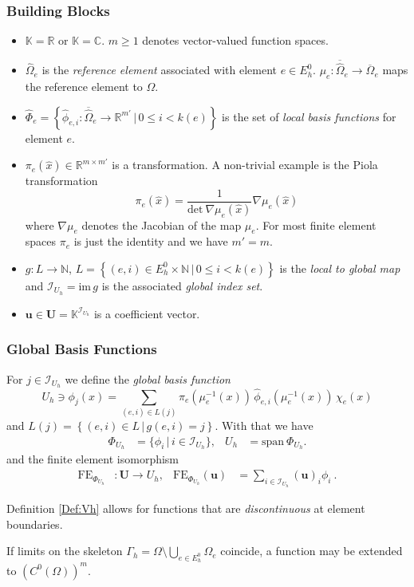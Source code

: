 \begin{frame}
\frametitle{Building Blocks}
\begin{itemize}
\item $\mathbb{K}=\mathbb{R}$ or $\mathbb{K}=\mathbb{C}$.
  $m\geq 1$ denotes vector-valued function spaces. 
\item $\hat\Omega_e$ is the \textit{reference element} associated with
element $e\in E_h^0$. $\mu_e : \overline{\hat\Omega}_e \to
  \overline{\Omega}_e$ maps the reference element to $\Omega$.
\item $\hat\Phi_e
  = \left\{\hat\phi_{e,i}: \overline{\hat\Omega}_e \to \mathbb{R}^{m'}\,|\,0\leq
  i < k(e)\right\}$ is 
  the set of \textit{local basis functions} for element $e$.
\item $\pi_e(\hat{x})\in\mathbb{R}^{m\times m'}$ is a
  transformation. A non-trivial example is the Piola
  transformation \cite{BrezziFortin}
\begin{equation*}
\pi_e(\hat{x}) = \frac{1}{\text{det}\  \nabla\mu_e(\hat{x})} \nabla \mu_e(\hat{x})
\end{equation*}
where $\nabla \mu_e$ denotes the Jacobian of the map $\mu_e$. For most
finite element spaces $\pi_e$ is just the identity and we have $m'=m$.
\item $g : L \to \mathbb{N}$, $L=\left\{ (e,i)\in E_h^0 \times
  \mathbb{N} \,|\, 0\leq i < k(e)\right\}$ is the \textit{local to global map}
  and $\mathcal{I}_{U_h} = \text{im}\,g$ is the associated \textit{global index set}.
\item $\mathbf{u}\in \mathbf{U}=\mathbb{K}^{\mathcal{I}_{U_h}}$ is a coefficient vector.
\end{itemize}
\end{frame}

\begin{frame}
\frametitle{Global Basis Functions}
For $j\in \mathcal{I}_{U_h}$ we define the \textit{global basis function}
\begin{equation*}
U_h \ni \phi_j(x) = \sum_{(e,i)\in L(j)} \pi_e(\mu_e^{-1}(x)) \,
\hat\phi_{e,i}(\mu_e^{-1}(x)) \, \chi_e(x)
\end{equation*} 
and $L(j) = \left\{ (e,i)\in L \,|\, g(e,i)=j \right\}$.
With that we have
\begin{align}
\Phi_{U_h} &= \{\phi_i \,|\, i\in \mathcal{I}_{U_h}\}, & U_h &= \text{span}\ \Phi_{U_h}.
\end{align}
and the finite element isomorphism
\begin{align}\label{Eq:FiniteElementIsomorphism}
\text{FE}_{\Phi_{U_h}} &: \mathbf{U} \to
U_h, & \text{FE}_{\Phi_{U_h}}(\mathbf{u})
&= \sum_{i\in\mathcal{I}_{U_h}} (\mathbf{u})_i \phi_i \ . 
\end{align} 

Definition \ref{Def:Vh} allows for functions that are
\textit{discontinuous} at element boundaries. 

If limits on the skeleton $\Gamma_h = \Omega\setminus \bigcup_ {e\in
  E_h^0} \Omega_e$ coincide, a function may be extended to 
$\left(C^0(\Omega)\right)^m$.
\end{frame}


